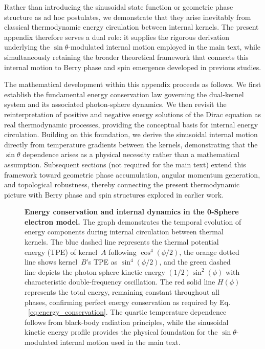 \documentclass[%
 reprint,
 amsmath,amssymb,
 aps,
 prb,
]{revtex4-2}
\numberwithin{equation}{section}
\begin{document}
Rather than introducing the sinusoidal state function or geometric phase structure as ad hoc postulates, we demonstrate that they arise inevitably from classical thermodynamic energy circulation between internal kernels. The present appendix therefore serves a dual role: it supplies the rigorous derivation underlying the $\sin\theta$-modulated internal motion employed in the main text, while simultaneously retaining the broader theoretical framework that connects this internal motion to Berry phase and spin emergence developed in previous studies.

The mathematical development within this appendix proceeds as follows. We first establish the fundamental energy conservation law governing the dual-kernel system and its associated photon-sphere dynamics. We then revisit the reinterpretation of positive and negative energy solutions of the Dirac equation as real thermodynamic processes, providing the conceptual basis for internal energy circulation. Building on this foundation, we derive the sinusoidal internal motion directly from temperature gradients between the kernels, demonstrating that the $\sin\theta$ dependence arises as a physical necessity rather than a mathematical assumption. Subsequent sections (not required for the main text) extend this framework toward geometric phase accumulation, angular momentum generation, and topological robustness, thereby connecting the present thermodynamic picture with Berry phase and spin structures explored in earlier work.


\begin{figure}[t!] %
    \centering 
    \resizebox{\textwidth}{!}{%
    }
    \caption{\justifying \textbf{Energy conservation and internal dynamics in the 0-Sphere electron model.} The graph demonstrates the temporal evolution of energy components during internal circulation between thermal kernels. The blue dashed line represents the thermal potential energy (TPE) of kernel~$A$ following $\cos^4(\phi/2)$, the orange dotted line shows kernel~$B$'s TPE as $\sin^4(\phi/2)$, and the green dashed line depicts the photon sphere kinetic energy $(1/2)\sin^2(\phi)$ with characteristic double-frequency oscillation. The red solid line $H(\phi)$ represents the total energy, remaining constant throughout all phases, confirming perfect energy conservation as required by Eq. ~\eqref{eq:energy_conservation}. The quartic temperature dependence follows from black-body radiation principles, while the sinusoidal kinetic energy profile provides the physical foundation for the $\sin\theta$-modulated internal motion used in the main text.
    }
    \label{fig:energy_conservation}
\end{figure}
\end{document}
